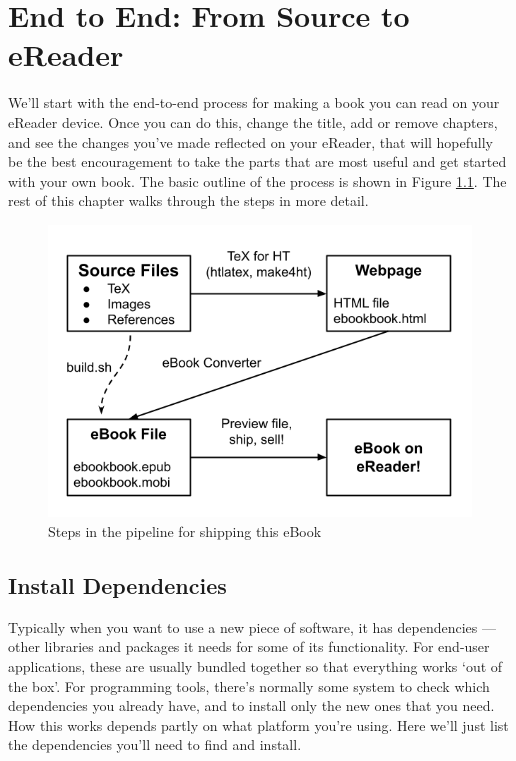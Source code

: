 
\chapter{End to End: From Source to eReader}

We'll start with the end-to-end process for making a book you can read
on your eReader device. Once you can do this, change the title,
add or remove chapters, and see the changes you've made reflected on your 
eReader, that will hopefully be the best encouragement to take the
parts that are most useful and get started with your own book.
The basic outline of the process is shown in Figure \ref{fig:pipeline}.
The rest of this chapter walks through the steps in more detail.

\begin{figure}
\begin{center}
  \includegraphics[width=\linewidth]{images/process.png}
 \vspace{0.2cm}
\caption{Steps in the pipeline for shipping this eBook}
\end{center}
\label{fig:pipeline}
\vspace{0.4cm}
\end{figure}

\section{Install Dependencies}

Typically when you want to use a new piece of software, it has
dependencies --- other libraries and packages it needs for some of its
functionality. For end-user applications, these are usually bundled
together so that everything works `out of the box'. For programming
tools, there's normally some system to check which dependencies you
already have, and to install only the new ones that you need. How this
works depends partly on what platform you're using. Here we'll just list
the dependencies you'll need to find and install.

